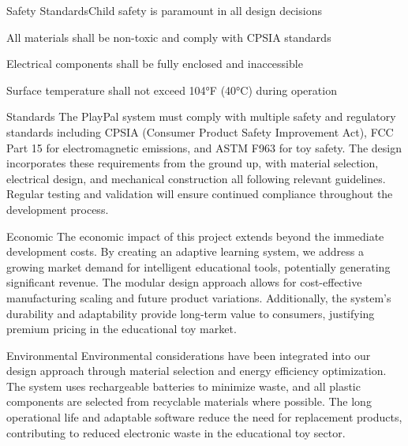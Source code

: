 \documentclass[final]{designreport}
\begin{document}
\begin{engineeringreq}{3}{Safety Standards}{Child safety is paramount in all design decisions}
    \item All materials shall be non-toxic and comply with CPSIA standards
    \item Electrical components shall be fully enclosed and inaccessible
    \item Surface temperature shall not exceed 104°F (40°C) during operation
\end{engineeringreq}

\impactstatements

\begin{impactstatement}{Standards}
The PlayPal system must comply with multiple safety and regulatory standards including CPSIA (Consumer Product Safety Improvement Act), FCC Part 15 for electromagnetic emissions, and ASTM F963 for toy safety. The design incorporates these requirements from the ground up, with material selection, electrical design, and mechanical construction all following relevant guidelines. Regular testing and validation will ensure continued compliance throughout the development process.
\end{impactstatement}

\begin{impactstatement}{Economic}
The economic impact of this project extends beyond the immediate development costs. By creating an adaptive learning system, we address a growing market demand for intelligent educational tools, potentially generating significant revenue. The modular design approach allows for cost-effective manufacturing scaling and future product variations. Additionally, the system's durability and adaptability provide long-term value to consumers, justifying premium pricing in the educational toy market.
\end{impactstatement}

\begin{impactstatement}{Environmental}
Environmental considerations have been integrated into our design approach through material selection and energy efficiency optimization. The system uses rechargeable batteries to minimize waste, and all plastic components are selected from recyclable materials where possible. The long operational life and adaptable software reduce the need for replacement products, contributing to reduced electronic waste in the educational toy sector.
\end{impactstatement}

\designsection
\end{document}
